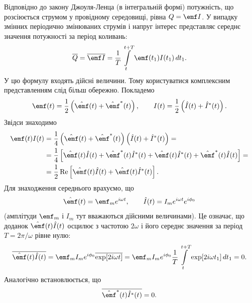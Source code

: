 Відповідно до закону Джоуля-Ленца (в інтегральній формі)
потужність, що розсіюється струмом у провідному середовищі, рівна $Q = \emf I$. У
випадку змінних періодично змінюваних струмів і напруг
інтерес представляє середнє значення потужності за період коливань:
\begin{equation}\label{eq:average_power}
	\overline{Q} = \overline{\emf I} = \frac{1}{T}\int\limits_{t}^{t+T} \emf(t_1)I(t_1) \, dt_1.
\end{equation}
У цю формулу входять дійсні величини. Тому користуватися
комплексним представленням слід більш обережно. Покладемо
\begin{equation}\label{eq:real_parts}
	\emf(t) = \frac{1}{2}\left(\hat{\emf}(t) + \hat{\emf}^*(t)\right), \qquad
	I(t) = \frac{1}{2}\left(\hat{I}(t) + \hat{I}^*(t)\right).
\end{equation}
Звідси знаходимо
\begin{equation}\label{eq:product_expansion}
	\begin{aligned}
		\emf(t)I(t) & = \frac{1}{4}\left(\hat{\emf}(t) + \hat{\emf}^*(t)\right)\left(\hat{I}(t) + \hat{I}^*(t)\right) =                                         \\
		            & = \frac{1}{4}\left[\hat{\emf}(t)\hat{I}(t) + \hat{\emf}^*(t)\hat{I}^*(t) + \hat{\emf}(t)\hat{I}^*(t) + \hat{\emf}^*(t)\hat{I}(t)\right] = \\
		            & = \frac{1}{2}\operatorname{Re}\left[\hat{\emf}(t)\hat{I}(t) + \hat{\emf}(t)\hat{I}^*(t)\right].
	\end{aligned}
\end{equation}
Для знаходження середнього врахуємо, що
\begin{equation}\label{eq:complex_amplitudes_time}
	\hat{\emf}(t) = \emf_m e^{i\omega t}, \qquad
	\hat{I}(t) = I_m e^{i\omega t} e^{i\phi_0}
\end{equation}
(амплітуди $\emf_m$ і $I_m$ тут вважаються дійсними величинами). Це
означає, що доданок $\hat{\emf}(t)\hat{I}(t)$ осцилює з частотою $2\omega$ і його середнє
значення за період $T = 2\pi/\omega$ рівне нулю:
\begin{equation}\label{eq:fast_oscillating_term}
	\overline{\hat{\emf}(t)\hat{I}(t)} = \emf_m I_m e^{i\phi_0} \overline{\exp[2i\omega t]}
	= \emf_m I_m e^{i\phi_0} \frac{1}{T}\int\limits_{t}^{t+T} \exp[2i\omega t_1] \, dt_1 = 0.
\end{equation}
Аналогічно встановлюється, що
\begin{equation}\label{eq:conjugate_term}
	\overline{\hat{\emf}^*(t)\hat{I}^*(t)} = 0.
\end{equation}
